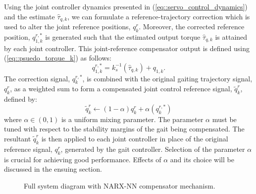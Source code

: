 Using the joint controller dynamics presented in (\ref{eq::servo_control_dynamics}) and the estimate $\hat{\tau}_{q,k}$, 
we can formulate a reference-trajectory correction  which is used to alter the joint reference positions, ${q}_{k}^{r}$. 
Moreover, the corrected reference position, ${q}_{1,k}^{r,*}$ is generated such that the estimated output
torque $\hat{\tau}_{q,k}$ is attained by each joint controller. This joint-reference compensator output is defined using 
(\ref{eq::psuedo_torque_k}) as follows:
	\begin{equation}
	 	{q}_{1,k}^{r,*} 	= k_{s}^{-1}  \left(  \hat{\tau}_{q,k}  \right) +  {q}_{1,k}.
		\label{eq::correction_equation}
	\end{equation}
The correction signal,  ${q}_{k}^{r,*}$, is combined with the original gaiting trajectory signal, ${q}_{k}^{r}$, as a weighted sum to form
a compensated joint control reference signal, $\tilde{q}_{k}^{r}$, defined by:
	\begin{equation}
	 	\tilde{q}_{k}^{r} 	\leftarrow (1-\alpha) {q}_{k}^{r} + \alpha ( {q}_{k}^{r,*} )
		\label{eq::correction_application}
	\end{equation}
where  $\alpha \in (0,1)$ is a uniform mixing parameter. The parameter $\alpha$ must be tuned with respect to the stability margins of the gait being compensated. 
The resultant $\tilde{q}_{k}^{r}$ is then applied  to each joint controller in place of the original reference signal,  ${q}_{k}^{r}$,  generated by the gait controller.
Selection of the parameter $\alpha$ is crucial for achieving good performance. Effects of $\alpha$ and its choice will be discussed in the ensuing section. 

	\begin{figure}[h!]
		\centering
		\caption{Full system diagram with NARX-NN compensator mechanism.}
		\label{fig::sys_diagram}
		\PostImageCloseSpace
	\end{figure}


